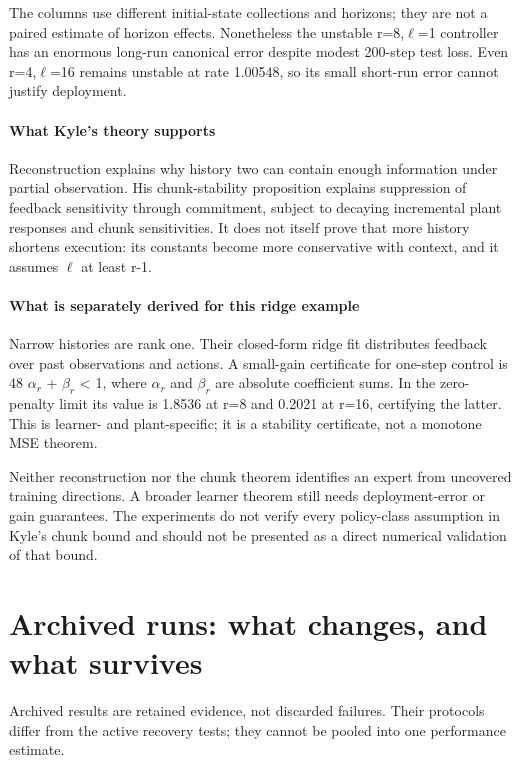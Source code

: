 \documentclass{l4dc2026}
\begin{document}
The columns use different initial-state collections and horizons; they are not a paired estimate of horizon effects. Nonetheless the unstable r=8,$\ell$=1 controller has an enormous long-run canonical error despite modest 200-step test loss. Even r=4,$\ell$=16 remains unstable at rate 1.00548, so its small short-run error cannot justify deployment.

\paragraph{What Kyle's theory supports}
Reconstruction explains why history two can contain enough information under partial observation. His chunk-stability proposition explains suppression of feedback sensitivity through commitment, subject to decaying incremental plant responses and chunk sensitivities. It does not itself prove that more history shortens execution: its constants become more conservative with context, and it assumes $\ell$ at least r-1.

\paragraph{What is separately derived for this ridge example}
Narrow histories are rank one. Their closed-form ridge fit distributes feedback over past observations and actions. A small-gain certificate for one-step control is 48 $\alpha_r$ + $\beta_r$ \textless{} 1, where $\alpha_r$ and $\beta_r$ are absolute coefficient sums. In the zero-penalty limit its value is 1.8536 at r=8 and 0.2021 at r=16, certifying the latter. This is learner- and plant-specific; it is a stability certificate, not a monotone MSE theorem.

Neither reconstruction nor the chunk theorem identifies an expert from uncovered training directions. A broader learner theorem still needs deployment-error or gain guarantees. The experiments do not verify every policy-class assumption in Kyle's chunk bound and should not be presented as a direct numerical validation of that bound.

\section{Archived runs: what changes, and what survives}
Archived results are retained evidence, not discarded failures. Their protocols differ from the active recovery tests; they cannot be pooled into one performance estimate.
\end{document}
